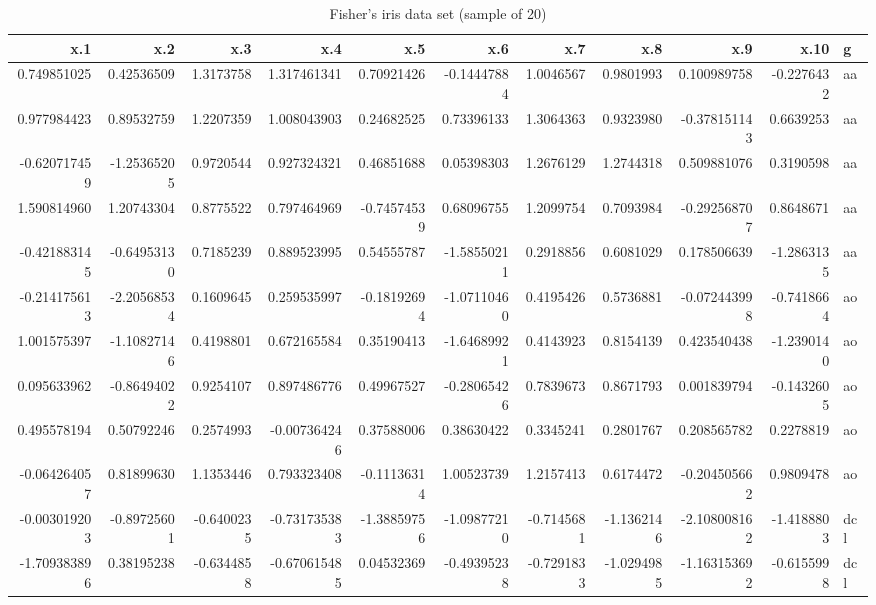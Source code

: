 \documentclass[
]{article}
\begin{document}
\begin{table}

\caption{\label{tab:unnamed-chunk-22}Fisher's iris data set (sample of 20)}
\centering
\begin{tabular}[t]{r|r|r|r|r|r|r|r|r|r|l}
\hline
x.1 & x.2 & x.3 & x.4 & x.5 & x.6 & x.7 & x.8 & x.9 & x.10 & g\\
\hline
0.749851025 & 0.42536509 & 1.3173758 & 1.317461341 & 0.70921426 & -0.14447884 & 1.0046567 & 0.9801993 & 0.100989758 & -0.2276432 & aa\\
\hline
0.977984423 & 0.89532759 & 1.2207359 & 1.008043903 & 0.24682525 & 0.73396133 & 1.3064363 & 0.9323980 & -0.378151143 & 0.6639253 & aa\\
\hline
-0.620717459 & -1.25365205 & 0.9720544 & 0.927324321 & 0.46851688 & 0.05398303 & 1.2676129 & 1.2744318 & 0.509881076 & 0.3190598 & aa\\
\hline
1.590814960 & 1.20743304 & 0.8775522 & 0.797464969 & -0.74574539 & 0.68096755 & 1.2099754 & 0.7093984 & -0.292568707 & 0.8648671 & aa\\
\hline
-0.421883145 & -0.64953130 & 0.7185239 & 0.889523995 & 0.54555787 & -1.58550211 & 0.2918856 & 0.6081029 & 0.178506639 & -1.2863135 & aa\\
\hline
-0.214175613 & -2.20568534 & 0.1609645 & 0.259535997 & -0.18192694 & -1.07110460 & 0.4195426 & 0.5736881 & -0.072443998 & -0.7418664 & ao\\
\hline
1.001575397 & -1.10827146 & 0.4198801 & 0.672165584 & 0.35190413 & -1.64689921 & 0.4143923 & 0.8154139 & 0.423540438 & -1.2390140 & ao\\
\hline
0.095633962 & -0.86494022 & 0.9254107 & 0.897486776 & 0.49967527 & -0.28065426 & 0.7839673 & 0.8671793 & 0.001839794 & -0.1432605 & ao\\
\hline
0.495578194 & 0.50792246 & 0.2574993 & -0.007364246 & 0.37588006 & 0.38630422 & 0.3345241 & 0.2801767 & 0.208565782 & 0.2278819 & ao\\
\hline
-0.064264057 & 0.81899630 & 1.1353446 & 0.793323408 & -0.11136314 & 1.00523739 & 1.2157413 & 0.6174472 & -0.204505662 & 0.9809478 & ao\\
\hline
-0.003019203 & -0.89725601 & -0.6400235 & -0.731735383 & -1.38859756 & -1.09877210 & -0.7145681 & -1.1362146 & -2.108008162 & -1.4188803 & dcl\\
\hline
-1.709383896 & 0.38195238 & -0.6344858 & -0.670615485 & 0.04532369 & -0.49395238 & -0.7291833 & -1.0294985 & -1.163153692 & -0.6155998 & dcl\\
\hline

\end{tabular}
\end{table}
\end{document}
